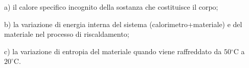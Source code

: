 \documentclass[10pt]{article}
\begin{document}
a) il calore specifico incognito della sostanza che costituisce il corpo;

b) la variazione di energia interna del sistema (calorimetro+materiale) e del materiale nel processo di riscaldamento;

c) la variazione di entropia del materiale quando viene raffreddato da \(50{ }^{\circ} \mathrm{C}\) a \(20^{\circ} \mathrm{C}\).
\end{document}
